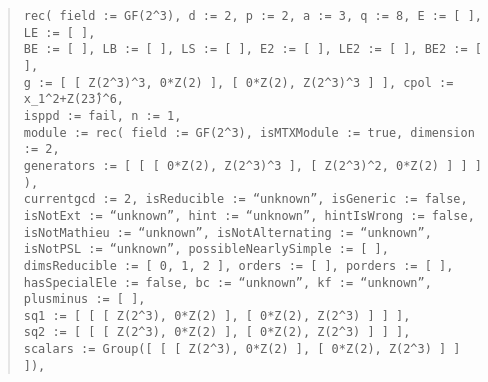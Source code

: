 \documentclass[a4paper,11pt]{article}
\theoremstyle{bla}
\begin{document}
\begin{quote}
\hspace*{-1cm} \texttt{rec( field := GF(2\^{}3), d := 2, p := 2, a := 3, q := 8, E := [  ], LE := [  ],}\\
  \hspace*{-1cm} \texttt{BE := [  ], LB := [  ], LS := [  ], E2 := [  ], LE2 := [  ], BE2 := [  ],}\\
  \hspace*{-1cm} \texttt{g := [ [ Z(2\^{}3)\^{}3, 0*Z(2) ], [ 0*Z(2), Z(2\^{}3)\^{}3 ] ], cpol := x\_1\^{}2+Z(2\^3{})\^{}6,}\\
  \hspace*{-1cm} \texttt{isppd := fail, n := 1,}\\
  \hspace*{-1cm} \texttt{module := rec( field := GF(2\^{}3), isMTXModule := true, dimension := 2,}\\
      \hspace*{-0.3cm} \texttt{generators := [ [ [ 0*Z(2), Z(2\^{}3)\^{}3 ], [ Z(2\^{}3)\^{}2, 0*Z(2) ] ] ] ),}\\
  \hspace*{-1cm} \texttt{currentgcd := 2, isReducible := ``unknown'', isGeneric := false,}\\
  \hspace*{-1cm} \texttt{isNotExt := ``unknown'', hint := ``unknown'', hintIsWrong := false,}\\
  \hspace*{-1cm} \texttt{isNotMathieu := ``unknown'', isNotAlternating := ``unknown'',}\\
  \hspace*{-1cm} \texttt{isNotPSL := ``unknown'', possibleNearlySimple := [  ],}\\
  \hspace*{-1cm} \texttt{dimsReducible := [ 0, 1, 2 ], orders := [  ], porders := [  ],}\\
  \hspace*{-1cm} \texttt{hasSpecialEle := false, bc := ``unknown'', kf := ``unknown'', plusminus := [  ],}\\
  \hspace*{-1cm} \texttt{sq1 := [ [ [ Z(2\^{}3), 0*Z(2) ], [ 0*Z(2), Z(2\^{}3) ] ] ],}\\
  \hspace*{-1cm} \texttt{sq2 := [ [ [ Z(2\^{}3), 0*Z(2) ], [ 0*Z(2), Z(2\^{}3) ] ] ],}\\
  \hspace*{-1cm} \texttt{scalars := Group([ [ [ Z(2\^{}3), 0*Z(2) ], [ 0*Z(2), Z(2\^{}3) ] ] ]),}\\

\end{quote}
\end{document}
